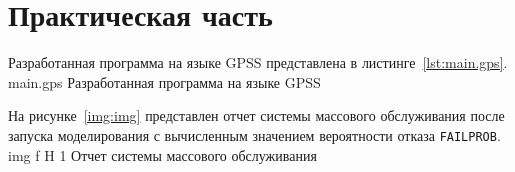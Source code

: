 \chapter{Практическая часть}

Разработанная программа на языке GPSS представлена в листинге~\ref{lst:main.gps}.
	{main.gps}
	{Разработанная программа на языке GPSS}

На рисунке~\ref{img:img} представлен отчет системы массового обслуживания после запуска моделирования с вычисленным значением вероятности отказа \texttt{FAILPROB}.
	{img}
	{f}
	{H}
	{1\textwidth}
	{Отчет системы массового обслуживания}